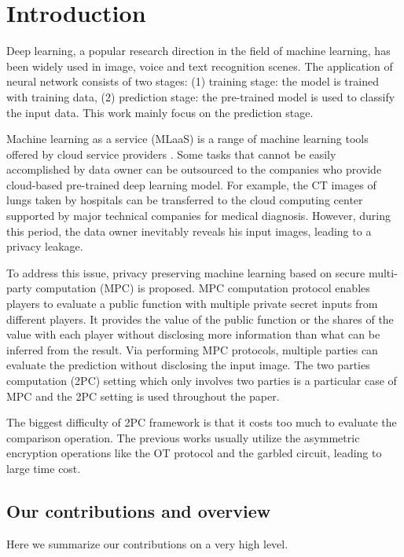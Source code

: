 \documentclass[letterpaper]{article} %
\begin{document}
\section{Introduction}



    \noindent Deep learning, a popular research direction in the field of machine learning,
    has been widely used in image, voice and text recognition scenes.
    The application of neural network consists of two stages:
    (1) training stage: the model is trained with training data,
    (2) prediction stage: the pre-trained model is used to classify the input data.
    This work mainly focus on the prediction stage.

    Machine learning as a service (MLaaS) is a range of machine learning tools offered by cloud service providers \cite{ChironCloud}.
    Some tasks that cannot be easily accomplished by data owner can be outsourced to
    the companies who provide cloud-based pre-trained deep learning model.
    For example, the CT images of lungs taken by hospitals
    can be transferred to the cloud computing center
    supported by major technical companies for medical diagnosis.
    However, during this period, the data owner inevitably reveals his input images,
    leading to a privacy leakage.

    To address this issue, privacy preserving machine learning based on secure multi-party
    computation (MPC) is proposed.
    MPC computation protocol enables players to evaluate a public function
    with multiple private secret inputs from different players.
    It provides the value of the public function or the shares of the value with each player
    without disclosing more information than what can be inferred from the result.
    Via performing MPC protocols,
    multiple parties can evaluate the prediction without disclosing the input image.
    The two parties computation (2PC) setting which only involves two parties is a particular case of MPC
    and the 2PC setting is used throughout the paper.

    The biggest difficulty of 2PC framework is that it costs too much to
    evaluate the comparison operation.
    The previous works usually utilize the asymmetric encryption
    operations like the  OT protocol and the garbled circuit,
    leading to large time cost.


    \subsection{Our contributions and overview}%
    Here we summarize our contributions on a very high level.
\end{document}
